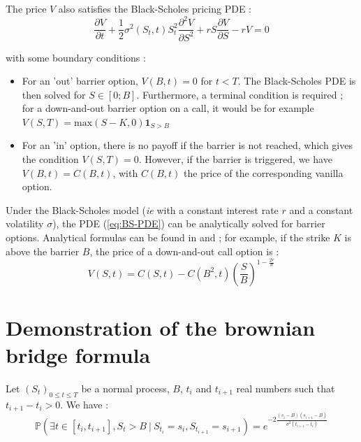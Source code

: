 \documentclass[a4paper,11pt,english]{book}
\begin{document}
The price $V$ also satisfies the Black-Scholes pricing PDE :
\begin{equation}
    \frac{\partial V}{\partial t} + \frac{1}{2}\sigma^2(S_t,t)S_t^2 \frac{\partial^2 V}{\partial S^2} + rS\frac{\partial V}{\partial S}-rV=0
    \label{eq:BS-PDE}
\end{equation}


with some boundary conditions :
\begin{itemize}
    \item For an 'out' barrier option, $V(B,t)=0$ for $t<T$. The Black-Scholes PDE is then solved for $S\in[0;B]$. Furthermore, a terminal condition is required ; for a down-and-out barrier option on a call, it would be for example $V(S,T)=\text{max}(S-K,0)\mathbf{1}_{S>B}$
    \item For an 'in' option, there is no payoff if the barrier is not reached, which gives the condition $V(S,T)=0$. However, if the barrier is triggered, we have $V(B,t)=C(B,t)$, with $C(B,t)$ the price of the corresponding vanilla option.
\end{itemize}

Under the Black-Scholes model (\textit{ie} with a constant interest rate $r$ and a constant volatility $\sigma$), the PDE (\ref{eq:BS-PDE}) can be analytically solved for barrier options. Analytical formulas can be found in \cite{hull2016options} and \cite{wilmott1998sons} ; for example, if the strike $K$ is above the barrier $B$, the price of a down-and-out call option is :
$$V(S,t)=C(S,t)-C(B^2,t)(\frac{S}{B})^{1-\frac{2r}{\sigma}}$$

\section{Demonstration of the brownian bridge formula}
\label{appendix:brownian-bridge}
Let $(S_t)_{0 \leq t \leq T}$ be a normal process, $B$, $t_i$ and $t_{i+1}$ real numbers such that $t_{i+1}-t_i>0$. We have : 
\begin{equation}
    \mathbb{P}(\exists t \in [t_i,t_{i+1}],S_t>B~|~S_{t_i}=s_i,S_{t_{i+1}}=s_{i+1}) = e^{-2 \frac{(s_i-B)(s_{i+1}-B)}{\sigma^2(t_{i+1}-t_i)}}
    \label{eq:brownian-bridge}
\end{equation}
    
\end{document}
